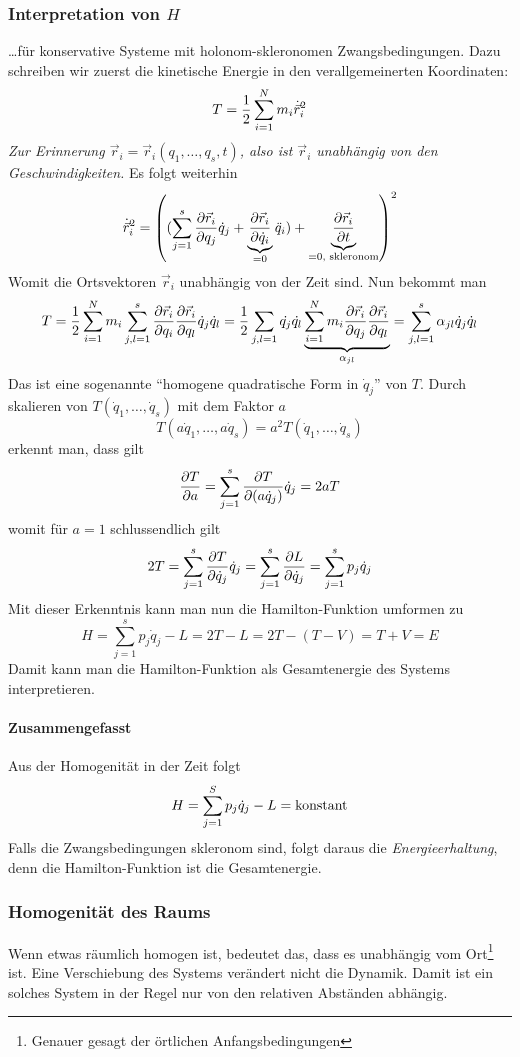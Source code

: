 \subsubsection{Interpretation von $H$} \dots für konservative Systeme mit holonom-skleronomen Zwangsbedingungen.
Dazu schreiben wir zuerst die kinetische Energie in den verallgemeinerten Koordinaten:
$$T = \frac12 \sum_{i=1}^N m_i \dot{\vec{r}}_i^2$$
\textit{Zur Erinnerung $\vec{r}_i = \vec{r}_i(q_1, \dots, q_s, t)$, also ist $\vec{r}_i$ unabhängig von den Geschwindigkeiten.} Es folgt weiterhin
$$\dot{\vec{r}}_i^2 = \left( (\sum_{j=1}^s \frac{\partial \vec{r}_i}{\partial q_j} \dot{q}_j + \underbrace{\frac{\partial \vec{r}_i}{\partial \dot{q}_i}}_{=0} \ddot{q}_i) + \underbrace{\frac{\partial \vec{r}_i}{\partial t}}_{=0, \text{ skleronom}}\right)^2 $$
Womit die Ortsvektoren $\vec{r}_i$ unabhängig von der Zeit sind. Nun bekommt man
$$T = \frac12 \sum_{i=1}^N m_i \sum_{j,l=1}^{s} \frac{\partial \vec{r}_i}{\partial q_i} \frac{\partial \vec{r}_i}{\partial q_l} \dot{q}_j \dot{q}_l = \frac12 \sum_{j,l = 1}^{} \dot{q_j} \dot{q_l} \underbrace{\sum_{i=1}^N m_i \frac{\partial \vec{r}_i}{\partial q_j} \frac{\partial \vec{r}_i}{\partial q_l}}_{\alpha_{jl}} = \sum_{j,l=1}^s \alpha_{jl} \dot{q}_j \dot{q}_l$$
Das ist eine sogenannte "`homogene quadratische Form in $\dot{q}_j$"' von $T$.
Durch skalieren von $T(\dot{q}_1, \dots, \dot{q}_s)$ mit dem Faktor $a$
$$T(a \dot{q}_1, \dots, a \dot{q}_s) = a^2 T(\dot{q}_1, \dots, \dot{q}_s)$$
erkennt man, dass gilt
$$\frac{\partial T}{\partial a} = \sum_{j=1}^s \frac{\partial T}{\partial (a \dot{q}_j)}\dot{q}_j = 2 a T$$
womit für $a = 1$ schlussendlich  gilt
$$ 2 T = \sum_{j=1}^s \frac{\partial T}{\partial \dot{q}_j} \dot{q}_j = \sum_{j=1}^s \frac{\partial L}{\partial \dot{q}_j} = \sum_{j=1}^s p_j \dot{q}_j$$
Mit dieser Erkenntnis kann man nun die Hamilton-Funktion umformen zu
$$H = \sum_{j=1}^s p_j \dot{q}_j - L = 2T - L = 2 T - (T-V) = T + V = E$$
Damit kann man die Hamilton-Funktion als Gesamtenergie des Systems interpretieren.






\paragraph{Zusammengefasst}
Aus der Homogenität in der Zeit folgt
\[H=\sum\limits_{j=1}^S p_j\dot q_j - L = \text{konstant}\]
Falls die Zwangsbedingungen skleronom sind, folgt daraus die \emph{Energieerhaltung}, denn die Hamilton-Funktion ist die Gesamtenergie.

\subsubsection{Homogenität des Raums}
Wenn etwas räumlich homogen ist, bedeutet das, dass es unabhängig vom Ort\footnote{Genauer gesagt der örtlichen Anfangsbedingungen} ist. Eine Verschiebung des Systems verändert nicht die Dynamik. Damit ist ein solches System in der Regel nur von den relativen Abständen abhängig.

